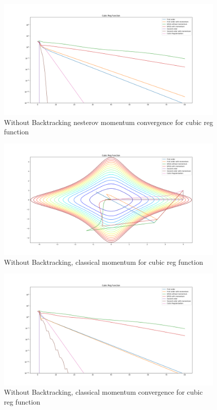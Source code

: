 \documentclass{article}
\begin{document}
\begin{figure}[H]
	\includegraphics[width=\linewidth]{../Images/cubicregularizationnesterov1.png}
	\caption{Without Backtracking nesterov momentum convergence for cubic reg function}
	\label{fig:Without Backtracking nesterov momentum convergence for cubic reg function}
\end{figure}

\begin{figure}[H]
	\includegraphics[width=\linewidth]{../Images/cubicregularizationmomentum.png}
	\caption{Without Backtracking, classical momentum for cubic reg function}
	\label{fig:Without Backtracking, classical momentum for cubic reg function}
\end{figure}

\begin{figure}[H]
	\includegraphics[width=\linewidth]{../Images/cubicregularizationmomentum1.png}
	\caption{Without Backtracking, classical momentum convergence for cubic reg function}
	\label{fig:Without Backtracking, classical momentum convergence for cubic reg function}
\end{figure}
\end{document}
